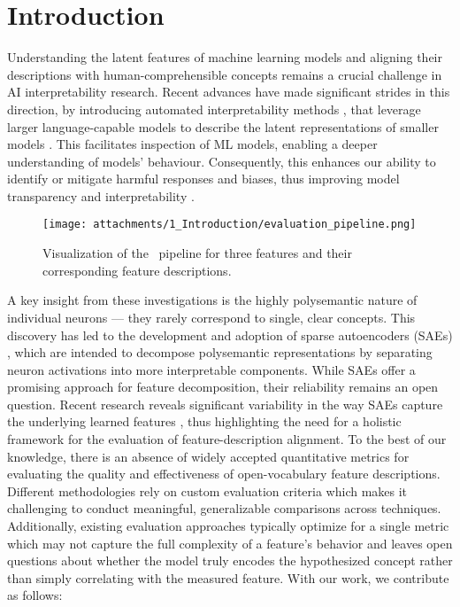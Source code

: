 \section{Introduction}

Understanding the latent features of machine learning models and aligning their descriptions with human-comprehensible concepts remains a crucial challenge in AI interpretability research. Recent advances have made significant strides in this direction, by introducing automated interpretability methods \cite{bills2023language, bykov2024labeling, choi2024automatic}, that leverage larger language-capable models to describe the latent representations of smaller models \cite{DBLP:journals/tmlr/BykovDGMH23, templeton2024scaling, dreyer2025mechanistic}. This facilitates inspection of ML models, enabling a deeper understanding of models' behaviour. Consequently, this enhances our ability to identify or mitigate harmful responses and biases, thus improving model transparency and interpretability \cite{lee2024mechanistic, gandikota2024erasing}.
%
\begin{figure*}[t!]
    \centering
    \texttt{[image: attachments/1\_Introduction/evaluation\_pipeline.png]} 
    \caption{Visualization of the \ours \ pipeline for three features and their corresponding feature descriptions.
    }
    \label{fig:evaluation-pipeline-graphic}
\end{figure*}
%
A key insight from these investigations is the highly polysemantic nature of individual neurons --- they rarely correspond to single, clear concepts. This discovery has led to the development and adoption of sparse autoencoders (SAEs) \cite{ goodfire, bricken2023monosemanticity, rajamanoharan2024jumpingaheadimprovingreconstruction}, which are intended to decompose polysemantic representations by separating neuron activations into more interpretable components. While SAEs offer a promising approach for feature decomposition, their reliability remains an open question. Recent research reveals significant variability in the way SAEs capture the underlying learned features \cite{heap2025sparse, paulo2025sparse}, thus highlighting the need for a holistic framework for the evaluation of feature-description alignment.
%
 To the best of our knowledge, there is an absence of widely accepted quantitative metrics for evaluating the quality and effectiveness of open-vocabulary feature descriptions.
 Different methodologies rely on custom evaluation criteria which makes it challenging to conduct meaningful, generalizable comparisons across techniques. Additionally, existing evaluation approaches typically optimize for a single metric \cite{bills2023language, choi2024automatic} which may not capture the full complexity of a feature's behavior and leaves open questions about whether the model truly encodes the hypothesized concept rather than simply correlating with the measured feature. With our work, we contribute as follows:\newline

